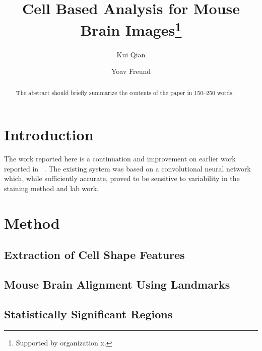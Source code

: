 \documentclass[runningheads]{llncs}
\begin{document}
%
\title{Cell Based Analysis for Mouse Brain Images\thanks{Supported by organization x.}}
%
%
\author{Kui Qian \and
Yoav Freund }
%
%
%
\maketitle              %
%
\begin{abstract}
The abstract should briefly summarize the contents of the paper in
150--250 words.

\end{abstract}
%
%
%
\section{Introduction}
The work reported here is a continuation and improvement on earlier
work reported in ~\cite{NatureMethods}. The existing system was based
on a convolutional neural network which, while sufficiently accurate,
proved to be sensitive to variability in the staining method and lab
work.



\section{Method}
\subsection{Extraction of Cell Shape Features}


\subsection{Mouse Brain Alignment Using Landmarks}


\subsection{Statistically Significant Regions}
\end{document}
